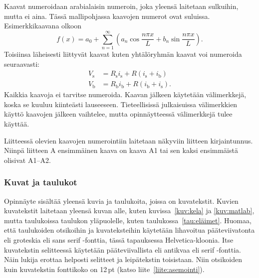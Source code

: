 \documentclass[finnish, 12pt, a4paper, elec, utf8, a-2b, online]{aaltothesis}
\begin{document}
Kaavat numeroidaan arabialaisin numeroin, joka yleensä laitetaan sulkuihin, 
mutta ei aina. Tässä mallipohjassa kaavojen numerot ovat suluissa. 
Esimerkkikaavana olkoon
\begin{equation}
	f(x) = a_0 + \sum_{n=1}^{\infty} \left( a_n \cos\frac{n\pi x}{L} + 
	b_n \sin\frac{n\pi x}{L} \right).
\end{equation}
Toisiinsa läheisesti liittyvät kaavat kuten yhtälöryhmän kaavat voi numeroida seuraavasti:
\begin{subequations}\label{eq:ohm}
	\begin{alignat}{1}
		V_\text{s} &= R_\text{s} i_\text{s} + R(i_\text{s} + i_\text{b})
		\label{eq:ohm1}\\
		V_\text{b} &= R_\text{b} i_\text{b} + R(i_\text{b} + i_\text{s}).
		\label{eq:ohm2}
	\end{alignat}
\end{subequations}
Kaikkia kaavoja ei tarvitse numeroida. Kaavan jälkeen käytetään välimerkkejä,
koska se kuuluu kiinteästi lauseeseen. Tieteellisissä julkaisuissa välimerkkien 
käyttö kaavojen jälkeen vaihtelee, mutta opinnäytteessä välimerkkejä tulee
käyttää.

Liitteessä olevien kaavojen numerointiin laitetaan näkyviin liitteen 
kirjaintunnus. Niinpä liitteen A ensimmäinen kaava on kaava A1 tai sen kaksi 
ensimmäistä olisivat A1--A2.

\subsubsection{Kuvat ja taulukot}

Opinnäyte sisältää yleensä kuvia ja taulukoita, joissa on kuvatekstit. Kuvien 
kuvatekstit laitetaan yleensä kuvan alle, kuten kuvissa~\ref{kuv:kela} ja 
\ref{kuv:matlab}, mutta taulukoissa taulukon yläpuolelle, kuten 
taulukossa~\ref{tau:eläimet}. Huomaa, että taulukoiden otsikoihin ja 
kuvateksteihin käytetään lihavoitua pääteviivatonta eli groteskia eli sans 
serif -fonttia, tässä tapauksessa Helvetica-kloonia. Itse kuvatekstin 
selitteessä käytetään pääteviivallista eli antikvaa eli serif -fonttia. Näin 
lukija erottaa helposti selitteet ja leipätekstin toisistaan. Niin otsikoiden 
kuin kuvatekstin fonttikoko on 12\,pt (katso liite~\ref{liite:asemointi}).
\end{document}
